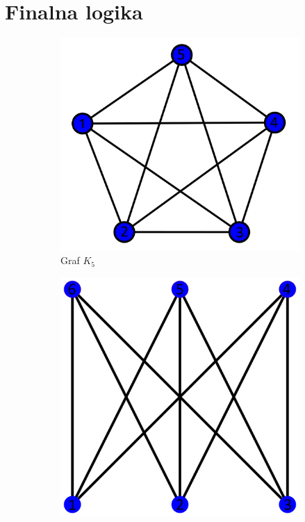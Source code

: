 \section{Finalna logika}

\begin{figure}[h]
    \centering
    \begin{subfigure}[b]{0.4\textwidth}
        \centering
        \includegraphics[width=\textwidth]{doc/fig/K5.png}
        \caption{Graf $K_5$}
        \label{fig:graph_k5}
    \end{subfigure}
    \hfill
    \begin{subfigure}[b]{0.3\textwidth}
        \centering
        \includegraphics[width=\textwidth]{doc/fig/K33.png}

\end{subfigure}
\end{figure}
